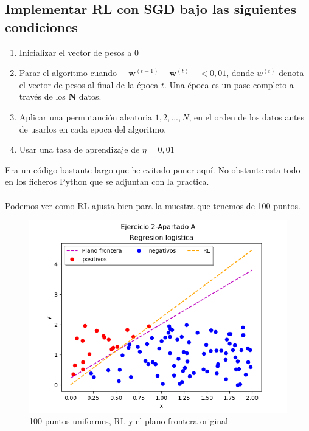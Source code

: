 \documentclass[12pt,a4paper]{article}
\begin{document}
\subsection{Implementar RL con SGD bajo las siguientes condiciones}
\begin{enumerate}
	\item Inicializar el vector de pesos a 0
	\item Parar el algoritmo cuando $\left\|\mathbf{w}^{(t-1)}-\mathbf{w}^{(t)}\right\|<0,01$, donde $w^{(t)}$ denota el vector de pesos al final de la época $t$. Una época es un pase completo  a través de los \textbf{N} datos.
	\item Aplicar una permutanción aleatoria $1,2,...,N$, en el orden de los datos antes de usarlos en cada epoca del algoritmo.
	\item Usar una tasa de aprendizaje de $\eta = 0,01$
\end{enumerate}
Era un código bastante largo que he evitado poner aquí. No obstante esta todo en los ficheros Python que se adjuntan con la practica.\\\\
Podemos ver como RL ajusta bien para la muestra que tenemos de 100 puntos. 
\begin{figure}[H]  %
	\centering
	\includegraphics{images/ejercicio2ApartadoA.png}  
	\caption{100 puntos uniformes, RL y el plano frontera original}
	\label{figura9}
\end{figure}
\end{document}
